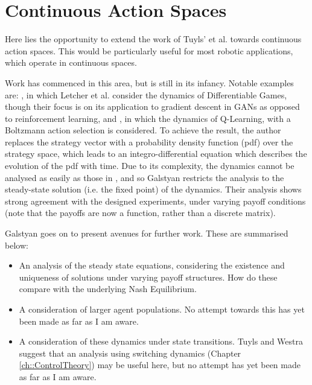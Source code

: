 \documentclass[../sample.tex]{subfiles}
\begin{document}
    \section{Continuous Action Spaces}

    Here lies the opportunity to extend the work of Tuyls' et al. \cite{Tuyls2006AnGames} towards
    continuous action spaces. This would be particularly useful for most robotic applications, which
    operate in continuous spaces. 

    Work has commenced in this area, but is still in its infancy. Notable examples are: 
    \cite{Letcher2019DifferentiableMechanics}, in which Letcher et al. consider the dynamics of
    Differentiable Games, though their focus is on its application to gradient descent in GANs as
    opposed to reinforcement learning, and \cite{Galstyan2013}, in which the dynamics of Q-Learning,
    with a Boltzmann action selection is considered. To achieve the result, the author replaces the
    strategy vector with a probability density function (pdf) over the strategy space, which leads
    to an integro-differential equation which describes the evolution of the pdf with time. Due to
    its complexity, the dynamics cannot be analysed as easily as those in \cite{Tuyls2006AnGames},
    and so Galstyan restricts the analysis to the steady-state solution (i.e. the fixed point) of
    the dynamics. Their analysis shows strong agreement with the designed experiments, under varying
    payoff conditions (note that the payoffs are now a function, rather than a discrete matrix).

    Galstyan goes on to present avenues for further work. These are summarised below:

    \begin{itemize}
        \item  An analysis of the steady state equations, considering the existence and uniqueness
        of solutions under varying payoff structures. How do these compare with the underlying Nash
        Equilibrium.
        \item A consideration of larger agent populations. No attempt towards this has yet been made
        as far as I am aware.
        \item A consideration of these dynamics under state transitions. Tuyls and Westra suggest
        that an analysis using switching dynamics (Chapter \ref{ch::ControlTheory}) may be useful
        here, but no attempt has yet been made as far as I am aware.
    \end{itemize}
        
\end{document}
